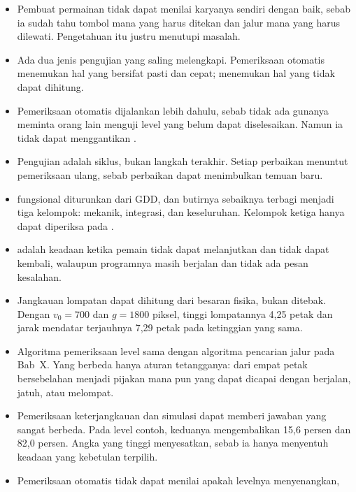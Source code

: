 
\begin{rangkumanbox}
\begin{itemize}
  \item Pembuat permainan tidak dapat menilai karyanya sendiri dengan baik,
        sebab ia sudah tahu tombol mana yang harus ditekan dan jalur mana yang
        harus dilewati. Pengetahuan itu justru menutupi masalah.
  \item Ada dua jenis pengujian yang saling melengkapi. Pemeriksaan otomatis
        menemukan hal yang bersifat pasti dan cepat; 
        menemukan hal yang tidak dapat dihitung.
  \item Pemeriksaan otomatis dijalankan lebih dahulu, sebab tidak ada gunanya
        meminta orang lain menguji level yang belum dapat diselesaikan. Namun
        ia tidak dapat menggantikan .
  \item Pengujian adalah siklus, bukan langkah terakhir. Setiap perbaikan
        menuntut pemeriksaan ulang, sebab perbaikan dapat menimbulkan temuan
        baru.
  \item {} fungsional diturunkan dari GDD, dan butirnya
        sebaiknya terbagi menjadi tiga kelompok: mekanik, integrasi, dan
        keseluruhan. Kelompok ketiga hanya dapat diperiksa pada
        .
  \item {} adalah keadaan ketika pemain tidak dapat
        melanjutkan dan tidak dapat kembali, walaupun programnya masih
        berjalan dan tidak ada pesan kesalahan.
  \item Jangkauan lompatan dapat dihitung dari besaran fisika, bukan ditebak.
        Dengan $v_0 = 700$ dan $g = 1800$ piksel, tinggi lompatannya 4,25
        petak dan jarak mendatar terjauhnya 7,29 petak pada ketinggian yang
        sama.
  \item Algoritma pemeriksaan level sama dengan algoritma pencarian jalur pada
        Bab~X. Yang berbeda hanya aturan tetangganya: dari empat petak
        bersebelahan menjadi pijakan mana pun yang dapat dicapai dengan
        berjalan, jatuh, atau melompat.
  \item Pemeriksaan keterjangkauan dan simulasi dapat memberi jawaban yang
        sangat berbeda. Pada level contoh, keduanya mengembalikan 15,6 persen
        dan 82,0 persen. Angka yang tinggi menyesatkan, sebab ia hanya
        menyentuh keadaan yang kebetulan terpilih.
  \item Pemeriksaan otomatis tidak dapat menilai apakah levelnya menyenangkan,

\end{itemize}
\end{rangkumanbox}

